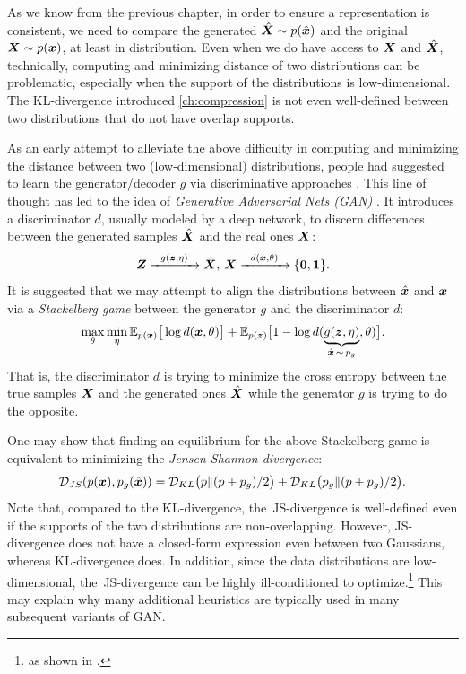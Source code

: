 \documentclass[../../book-main.tex]{subfiles}
\begin{document}
As we know from the previous chapter, in order to ensure a representation is consistent, we need to compare the generated $\hat {\bm{X}} \sim p(\hat{\bm{x}})$ and the original $\bm{X} \sim p(\bm{x})$, at least in distribution. Even when we do have access to $\bm{X}$ and $\hat {\bm{X}}$, technically, computing and minimizing distance of two distributions can be problematic, especially when the support of the distributions is low-dimensional. The KL-divergence introduced \ref{ch:compression} is not even well-defined between two distributions that do not have overlap supports. 

As an early attempt to alleviate the above difficulty in computing and minimizing the distance between two (low-dimensional)  distributions, people had suggested to learn the generator/decoder $g$ via discriminative approaches \cite{Tu-2007}. This line of thought has led to  the idea of {\em Generative Adversarial Nets (GAN)} \cite{goodfellow2014generative}. It introduces a discriminator $d$, usually modeled by a deep network, to discern differences between the generated samples $\hat {\bm{X}}$ and the real ones $\bm{X}$:
\begin{equation}
 \bm{Z} \xrightarrow{\hspace{2mm} g(\bm{z},\eta) \hspace{2mm}} \hat {\bm{X}}, \, \bm{X} \xrightarrow{\hspace{2mm} d(\bm{x}, \theta)\hspace{2mm}} \{\mathbf 0, \mathbf 1\}.
 \label{eqn:GAN}
\end{equation}
It is suggested that we may attempt to align the distributions between $\hat {\bm{x}}$ and $\bm{x}$ via a {\em Stackelberg game} between the generator $g$ and the discriminator $d$:
\begin{equation}
\max_{\theta}\min_{\eta} \mathbb{E}_{p({\bm{x}})}\big[\log d(\bm{x},\theta)\big] + \mathbb{E}_{p({\bm{z}})}\big[1 - \log d(\underbrace{g(\bm{z},\eta)}_{\hat {\bm{x}} \,\sim\, p_g},\theta)\big].
\end{equation}
That is, the discriminator $d$ is trying to minimize the cross entropy between the true samples $\bm{X}$ and the generated ones $\hat {\bm{X}}$ while the generator $g$ is trying to do  the opposite. 

One may show that finding an equilibrium for the above Stackelberg game is equivalent to minimizing the {\em Jensen-Shannon divergence}:
\begin{equation}
    \mathcal{D}_{JS}(p(\bm{x}), p_g(\hat {\bm{x}})) = \mathcal{D}_{KL}\big(p \| (p + p_g)/{2}\big) + \mathcal{D}_{KL}\big(p_g \| (p + p_g)/{2}\big).
\end{equation}
Note that, compared to the KL-divergence, the~JS-divergence is well-defined even if the supports of the two distributions are non-overlapping. However, JS-divergence does not have a closed-form expression even between two Gaussians, whereas KL-divergence does. In addition, since the data distributions are low-dimensional, the~JS-divergence can be highly ill-conditioned to optimize.\footnote{as shown in \cite{arjovsky2017wasserstein}.} This may explain why many additional heuristics are typically used in many subsequent variants of GAN. 
\end{document}
